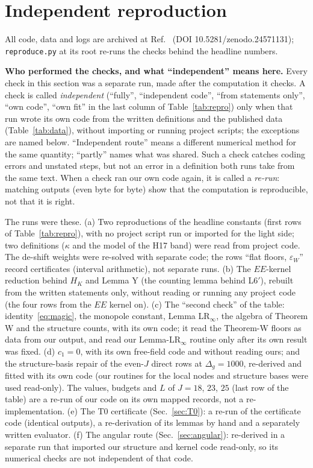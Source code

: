 \documentclass[aps,prl,onecolumn,superscriptaddress,nofootinbib]{revtex4-2}
\begin{document}
\section{Independent reproduction}
\label{sec:repro}

All code, data and logs are archived at Ref.~\cite{Zenodo} (DOI 10.5281/zenodo.24571131); \texttt{reproduce.py} at its root
re-runs the checks behind the headline numbers.

\textbf{Who performed the checks, and what ``independent'' means here.} Every check in this section was a separate run, made after
the computation it checks. A check is called
\emph{independent} (``fully'', ``independent code'', ``from statements only'', ``own code'', ``own fit'' in the last column of Table~\ref{tab:repro}) only when that run wrote its own code from the written definitions
and the published data (Table~\ref{tab:data}), without importing or running project scripts; the exceptions are named below.
``Independent route'' means a different numerical method for the same quantity; ``partly'' names what was shared. Such a check
catches coding
errors and unstated steps, but not an error in a definition both runs take from the same text. When a check ran our own code again,
it is called a \emph{re-run}: matching outputs (even byte for byte) show that the computation is reproducible, not that it is right.

The runs were these. (a) Two reproductions of the headline constants (first rows of Table~\ref{tab:repro}), with no project script
run or imported for the light side; two definitions ($\kappa$ and the model of the H17 band) were read from project code. The de-shift
weights were re-solved with separate code; the rows ``flat floors, $\varepsilon_W$'' record certificates (interval arithmetic), not
separate runs. (b) The $EE$-kernel
reduction behind $H_K$ and Lemma Y (the counting lemma behind L6$'$), rebuilt from the written statements only, without reading or
running any project code (the four rows from the $EE$ kernel on). (c) The ``second check'' of the table: identity~\eqref{eq:magic},
the monopole constant, Lemma LR$_\infty$, the algebra of Theorem W and the structure counts, with its own code; it read the
Theorem-W floors as data from our output, and read our Lemma-LR$_\infty$ routine only after its own result was fixed. (d) $c_1=0$,
with its own free-field code and without reading ours; and the structure-basis repair of the even-$J$ direct rows at
$\Delta_g=1000$, re-derived and fitted with its own code (our routines for the local nodes and structure bases were used
read-only). The values, budgets and $L$ of $J=18$, $23$, $25$ (last row of the table)
are a re-run of our code on its own mapped records, not a re-implementation. (e) The T0 certificate (Sec.~\ref{sec:T0}): a re-run
of the certificate code (identical outputs), a re-derivation of its lemmas by hand and a separately written evaluator. (f) The
angular route (Sec.~\ref{sec:angular}): re-derived in a separate run that imported our structure and kernel code read-only, so its
numerical checks are not independent of that code.
\end{document}
